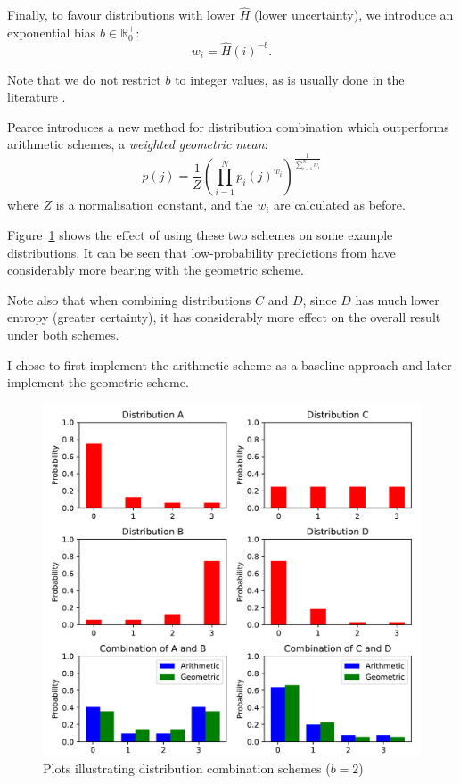 \documentclass[12pt,a4paper,twoside,openright]{report}
\begin{document}
Finally, to favour distributions with lower $\hat{H}$ (lower uncertainty), we
introduce an exponential bias $b \in \mathbb{R}_0^+$: $$ w_i = \hat{H}(i)^{-b}.
$$

Note that we do not restrict $b$ to integer values, as is usually done in the
literature \cite{whorley2013phd}. 

Pearce \cite{pearce2004improved} introduces a new method for distribution
combination which outperforms arithmetic schemes, a \emph{weighted geometric
mean}:
$$ p(j) = \frac{1}{Z} \left( \prod_{i = 1}^N p_i(j)^{w_i} \right)^{ \frac{1}{
\sum_{i = 1}^N w_i }} $$
where $Z$ is a normalisation constant, and the $w_i$ are calculated as before.

Figure~\ref{fig:dist-comb-plot} shows the effect of using these two schemes on
some example distributions. It can be seen that low-probability predictions from
have considerably more bearing with the geometric scheme.

Note also that when combining distributions $C$ and $D$, since $D$ has much
lower entropy (greater certainty), it has considerably more effect on the
overall result under both schemes.

I chose to first implement the arithmetic scheme as a baseline approach and
later implement the geometric scheme.

\begin{figure}[H]
\centering
\includegraphics[width=400pt]{figs/dist_comb.pdf}
\caption{Plots illustrating distribution combination schemes ($b = 2$)}
\label{fig:dist-comb-plot}
\end{figure}
\end{document}
